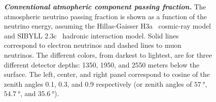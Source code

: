 \begin{figure}
	\centering
	\internallinenumbers
	\caption{\textbf{\textit{Conventional atmopheric component passing fraction.}}
		The atmospheric neutrino passing fraction is shown as a function of the neutrino energy, assuming the Hillas-Gaisser H3a~\cite{Gaisser:2013bla,Gaisser:2011cc,Hillas:2006ms} cosmic-ray model and SIBYLL 2.3c~\cite{Riehn:2017mfm} hadronic interaction model.
		Solid lines correspond to electron neutrinos and dashed lines to muon neutrinos.
		The different colors, from darkest to lightest, are for three different detector depths: 1350, 1950, and 2550 meters below the surface.
		The left, center, and right panel correspond to cosine of the zenith angles 0.1, 0.3, and 0.9 respectively (or zenith angles of $\SI{57}\degree$, $\SI{54.7}\degree$, and $\SI{35.6}\degree$).}\label{fig:passingfraction_conventional}
\end{figure}

